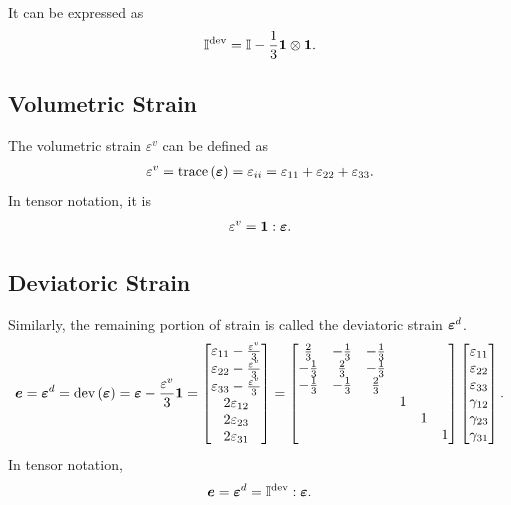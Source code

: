 It can be expressed as
\begin{gather}
\mathbb{I}^\text{dev}=\mathbb{I}-\dfrac{1}{3}\bm{1}\otimes\bm{1}.
\end{gather}
\subsection{Volumetric Strain}
The volumetric strain $\varepsilon^v$ can be defined as
\begin{gather}
\varepsilon^v=\text{trace}\left(\bm{\varepsilon}\right)=\varepsilon_{ii}=\varepsilon_{11}+\varepsilon_{22}+\varepsilon_{33}.
\end{gather}
In tensor notation, it is
\begin{gather}
\varepsilon^v=\bm{1}:\bm{\varepsilon}.
\end{gather}
\subsection{Deviatoric Strain}
Similarly, the remaining portion of strain is called the deviatoric strain $\bm{\varepsilon}^d$.
\begin{gather}
\bm{e}=\bm{\varepsilon}^d=\text{dev}\left(\bm{\varepsilon}\right)=\bm{\varepsilon}-\dfrac{\varepsilon^v}{3}\bm{1}=\begin{bmatrix}
\varepsilon_{11}-\frac{\varepsilon^v}{3}\\\varepsilon_{22}-\frac{\varepsilon^v}{3}\\\varepsilon_{33}-\frac{\varepsilon^v}{3}\\2\varepsilon_{12}\\2\varepsilon_{23}\\2\varepsilon_{31}
\end{bmatrix}=\begin{bmatrix}
\frac{2}{3}&-\frac{1}{3}&-\frac{1}{3}&&&\\
-\frac{1}{3}&\frac{2}{3}&-\frac{1}{3}&&&\\
-\frac{1}{3}&-\frac{1}{3}&\frac{2}{3}&&&\\
&&&1&&\\
&&&&1&\\
&&&&&1
\end{bmatrix}\begin{bmatrix}
\varepsilon_{11}\\\varepsilon_{22}\\\varepsilon_{33}\\\gamma_{12}\\\gamma_{23}\\\gamma_{31}
\end{bmatrix}.
\end{gather}
In tensor notation,
\begin{gather}
\bm{e}=\bm{\varepsilon}^d=\mathbb{I}^\text{dev}:\bm{\varepsilon}.
\end{gather}
